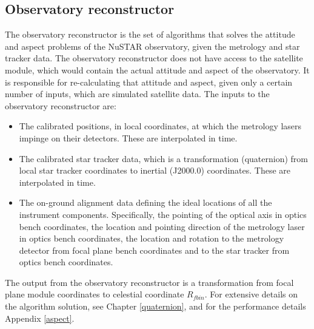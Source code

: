 \subsection{Observatory reconstructor}
The observatory reconstructor is the set of algorithms that solves the attitude and aspect problems of the NuSTAR observatory, given the metrology and star tracker data. The observatory reconstructor does not have access to the satellite module, which would contain the actual attitude and aspect of the observatory. It is responsible for re-calculating that attitude and aspect, given only a certain number of inputs, which are simulated satellite data.
The inputs to the observatory reconstructor are:
\begin{itemize}
\item The calibrated positions, in local coordinates, at which the metrology lasers impinge on their detectors. These are interpolated in time.
\item The calibrated star tracker data, which is a transformation (quaternion) from local star tracker coordinates to inertial (J2000.0) coordinates. These are interpolated in time. 
\item The on-ground alignment data defining the ideal locations of all the instrument components. Specifically, the pointing of the optical axis in optics bench coordinates, the location and pointing direction of the metrology laser in optics bench coordinates, the location and rotation to the metrology detector from focal plane bench coordinates and to the star tracker from optics bench coordinates.
\end{itemize}
The output from the observatory reconstructor is a transformation from focal plane module coordinates to celestial coordinate $R_{fbin}$.
For extensive details on the algorithm solution, see Chapter \ref{quaternion}, and for the performance details Appendix \ref{aspect}.
